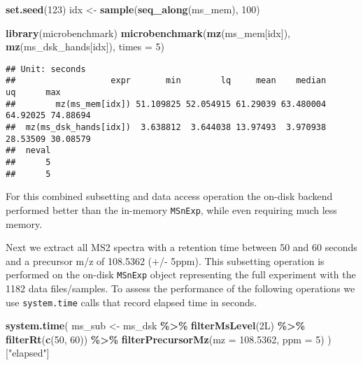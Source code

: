 \documentclass[journal=jacsat,manuscript=suppinfo]{achemso}
\newenvironment{Shaded}{\begin{snugshade}}{\end{snugshade}}
\newcommand{\DataTypeTok}[1]{\textcolor[rgb]{0.13,0.29,0.53}{#1}}
\newcommand{\DecValTok}[1]{\textcolor[rgb]{0.00,0.00,0.81}{#1}}
\newcommand{\FloatTok}[1]{\textcolor[rgb]{0.00,0.00,0.81}{#1}}
\newcommand{\KeywordTok}[1]{\textcolor[rgb]{0.13,0.29,0.53}{\textbf{#1}}}
\newcommand{\NormalTok}[1]{#1}
\newcommand{\OperatorTok}[1]{\textcolor[rgb]{0.81,0.36,0.00}{\textbf{#1}}}
\newcommand{\StringTok}[1]{\textcolor[rgb]{0.31,0.60,0.02}{#1}}
\begin{document}
\begin{Shaded}
\begin{Highlighting}[]
\KeywordTok{set.seed}\NormalTok{(}\DecValTok{123}\NormalTok{)}
\NormalTok{idx \textless{}{-}}\StringTok{ }\KeywordTok{sample}\NormalTok{(}\KeywordTok{seq\_along}\NormalTok{(ms\_mem), }\DecValTok{100}\NormalTok{)}

\KeywordTok{library}\NormalTok{(microbenchmark)}
\KeywordTok{microbenchmark}\NormalTok{(}\KeywordTok{mz}\NormalTok{(ms\_mem[idx]),}
               \KeywordTok{mz}\NormalTok{(ms\_dsk\_hands[idx]),}
               \DataTypeTok{times =} \DecValTok{5}\NormalTok{)}
\end{Highlighting}
\end{Shaded}

\begin{verbatim}
## Unit: seconds
##                   expr       min        lq     mean    median       uq      max
##        mz(ms_mem[idx]) 51.109825 52.054915 61.29039 63.480004 64.92025 74.88694
##  mz(ms_dsk_hands[idx])  3.638812  3.644038 13.97493  3.970938 28.53509 30.08579
##  neval
##      5
##      5
\end{verbatim}

For this combined subsetting and data access operation the on-disk
backend performed better than the in-memory \texttt{MSnExp}, while even
requiring much less memory.

Next we extract all MS2 spectra with a retention time between 50 and 60
seconds and a precursor m/z of 108.5362 (+/- 5ppm). This subsetting
operation is performed on the on-disk \texttt{MSnExp} object
representing the full experiment with the 1182 data files/samples. To
assess the performance of the following operations we use
\texttt{system.time} calls that record elapsed time in seconds.

\begin{Shaded}
\begin{Highlighting}[]
\KeywordTok{system.time}\NormalTok{(}
\NormalTok{    ms\_sub \textless{}{-}}\StringTok{ }\NormalTok{ms\_dsk }\OperatorTok{\%\textgreater{}\%}
\StringTok{        }\KeywordTok{filterMsLevel}\NormalTok{(2L) }\OperatorTok{\%\textgreater{}\%}
\StringTok{        }\KeywordTok{filterRt}\NormalTok{(}\KeywordTok{c}\NormalTok{(}\DecValTok{50}\NormalTok{, }\DecValTok{60}\NormalTok{)) }\OperatorTok{\%\textgreater{}\%}
\StringTok{        }\KeywordTok{filterPrecursorMz}\NormalTok{(}\DataTypeTok{mz =} \FloatTok{108.5362}\NormalTok{, }\DataTypeTok{ppm =} \DecValTok{5}\NormalTok{)}
\NormalTok{)[}\StringTok{"elapsed"}\NormalTok{]}
\end{Highlighting}
\end{Shaded}
\end{document}
